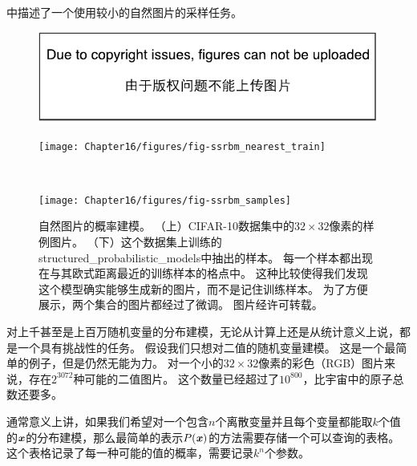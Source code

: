 中描述了一个使用较小的自然图片的采样任务。

\begin{figure}[!htb]
\ifOpenSource
\centerline{\includegraphics{figure.pdf}}
\else
	\centerline{\texttt{[image: Chapter16/figures/fig-ssrbm\_nearest\_train]}}\ \\
     \centerline{\texttt{[image: Chapter16/figures/fig-ssrbm\_samples]}}
\fi
	\caption{自然图片的概率建模。
（上）CIFAR-10数据集\citep{KrizhevskyHinton2009}中的$32\times 32$像素的样例图片。
（下）这个数据集上训练的\gls{structured_probabilistic_models}中抽出的样本。
每一个样本都出现在与其欧式距离最近的训练样本的格点中。
这种比较使得我们发现这个模型确实能够生成新的图片，而不是记住训练样本。
为了方便展示，两个集合的图片都经过了微调。
图片经\citet{Courville+al-2011-small}许可转载。}
	\label{fig:chap16_fig-ssrbm}
\end{figure}

对上千甚至是上百万随机变量的分布建模，无论从计算上还是从统计意义上说，都是一个具有挑战性的任务。
假设我们只想对二值的随机变量建模。
这是一个最简单的例子，但是仍然无能为力。
对一个小的$32\times 32$像素的彩色（RGB）图片来说，存在$2^{3072}$种可能的二值图片。
这个数量已经超过了$10^{800}$，比宇宙中的原子总数还要多。

通常意义上讲，如果我们希望对一个包含$n$个离散变量并且每个变量都能取$k$个值的$\boldsymbol{\mathit{x}}$的分布建模，那么最简单的表示$P(\boldsymbol{\mathit{x}})$的方法需要存储一个可以查询的表格。
这个表格记录了每一种可能的值的概率，需要记录$k^n$个参数。

